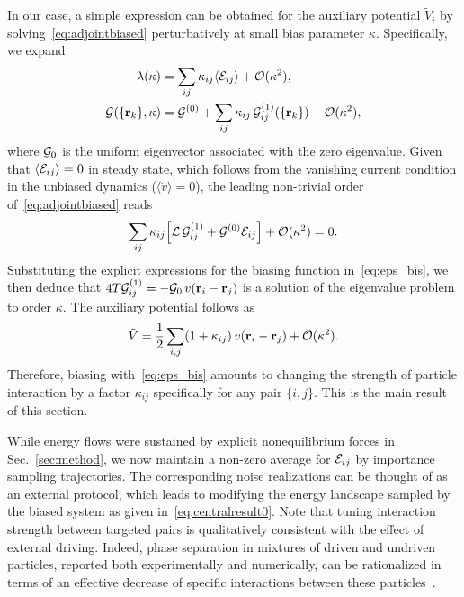 \documentclass[superscriptaddress, twocolumn, prx, longbibliography, nofootinbib]{revtex4-1}
\begin{document}
In our case, a simple expression can be obtained for the auxiliary potential $\tilde V_i$ by solving~\eqref{eq:adjointbiased} perturbatively at small bias parameter $\kappa$. Specifically, we expand
\begin{equation}
	\begin{aligned}
		\lambda(\kappa) &= \sum_{ij} \kappa_{ij} \langle{\cal E}_{ij}\rangle + {\cal O}(\kappa^2) ,
		\\
		{\cal G}(\{{\bf r}_k\},\kappa) &= {\cal G}^{(0)} + \sum_{ij}\kappa_{ij}\,{\cal G}^{(1)}_{ij}(\{{\bf r}_k\}) + {\cal O}(\kappa^2) ,
	\end{aligned}
\end{equation}
where ${\cal G}_0$ is the uniform eigenvector associated with the zero eigenvalue. Given that $\langle{\cal E}_{ij}\rangle=0$ in steady state, which follows from the vanishing current condition in the unbiased dynamics ($\langle\dot v\rangle=0$), the leading non-trivial order of~\eqref{eq:adjointbiased} reads
\begin{equation}\label{eq:eigenvalue}
	\sum_{ij} \kappa_{ij} \Big[ {\cal L}\, {\cal G}^{(1)}_{ij} + {\cal G}^{(0)} {\cal E}_{ij} \Big] + {\cal O}(\kappa^2) = 0 .
\end{equation}
Substituting the explicit expressions for the biasing function in~\eqref{eq:eps_bis}, we then deduce that $4T{\cal G}^{(1)}_{ij} = -{\cal G}_0\,v({\bf r}_i-{\bf r}_j)$ is a solution of the eigenvalue problem to order $\kappa$. The auxiliary potential follows as
\begin{equation}\label{eq:centralresult0}
	\tilde V = \frac{1}{2}\sum_{i,j} (1+\kappa_{ij})\, v({\bf r}_i-{\bf r}_j) + {\cal O}(\kappa^2) .
\end{equation}
Therefore, biasing with~\eqref{eq:eps_bis} amounts to changing the strength of particle interaction by a factor $\kappa_{ij}$ specifically for any pair $\{i,j\}$. This is the main result of this section.


While energy flows were sustained by explicit nonequilibrium forces in Sec.~\ref{sec:method}, we now maintain a non-zero average for ${\cal E}_{ij}$ by importance sampling trajectories. The corresponding noise realizations can be thought of as an external protocol, which leads to modifying the energy landscape sampled by the biased system as given in~\eqref{eq:centralresult0}. Note that tuning interaction strength between targeted pairs is qualitatively consistent with the effect of external driving. Indeed, phase separation in mixtures of driven and undriven particles, reported both experimentally and numerically, can be rationalized in terms of an effective decrease of specific interactions between these particles~\cite{delJunco2018,Han2016}.
\end{document}
